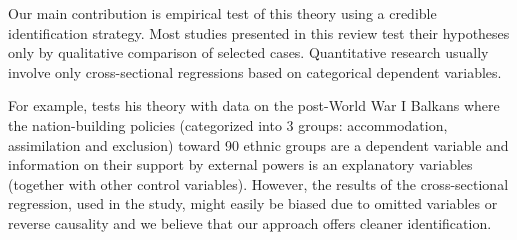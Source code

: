 

Our main contribution is empirical test of this theory using a credible identification strategy. Most studies presented in this review test their hypotheses only by qualitative comparison of selected cases. Quantitative research usually involve only cross-sectional regressions based on categorical dependent variables.    

For example, \citet{mylonas_politics_2013} tests his theory with data on the post-World War I Balkans where the nation-building policies (categorized into 3 groups: accommodation, assimilation and exclusion)  toward  90 ethnic groups are a dependent variable and information on their support by external powers is an explanatory variables (together with other control variables). However, the results of the cross-sectional regression, used in the study, might easily be biased due to omitted variables or reverse causality and we believe that our approach offers cleaner identification.



